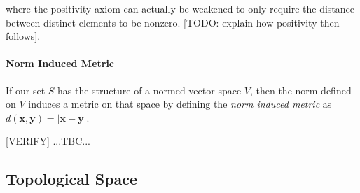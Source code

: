 where the positivity axiom can actually be weakened to only require the distance between distinct elements to be nonzero. [TODO: explain how positivity then follows].

\paragraph{Norm Induced Metric}
If our set $S$ has the structure of a normed vector space $V$, then the norm defined on $V$ induces a metric on that space by defining the \emph{norm induced metric} as $d(\mathbf{x, y}) = |\mathbf{x-y}|$. 

\medskip
[Q: Can we turn this around by saying that a metric induces a norm by defining the norm as distance from the origin $|\mathbf{x}| = d (\mathbf{x, 0})$ whenever our set happens to have some special element $\mathbf{0}$ that we call the origin?]












[VERIFY] ...TBC...




\subsection{Topological Space}

\begin{comment}



\end{comment}